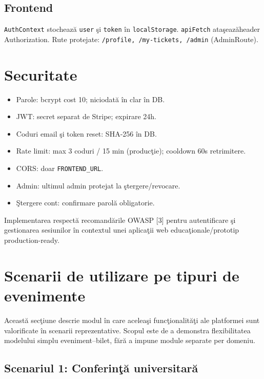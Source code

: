 \subsection{Frontend}

\texttt{AuthContext} stocheaz\u a \texttt{user} \c si \texttt{token} \^in \texttt{localStorage}. \texttt{apiFetch} \linebreak ata\c seaz\u aheader Authorization. Rute protejate: \texttt{/profile, /my-tickets, /admin} (AdminRoute).



\section{Securitate}

\begin{itemize}
	\item Parole: bcrypt cost 10; niciodat\u a \^in clar \^in DB.
	\item JWT: secret separat de Stripe; expirare 24h.
	\item Coduri email \c si token reset: SHA-256 \^in DB.
	\item Rate limit: max 3 coduri / 15 min (produc\c tie); cooldown 60s retrimitere.
	\item CORS: doar \texttt{FRONTEND\_URL}.
	\item Admin: ultimul admin protejat la \c stergere/revocare.
	\item \c Stergere cont: confirmare parol\u a obligatorie.
\end{itemize}

Implementarea respect\u a recomand\u arile OWASP [3] pentru autentificare \c si gestionarea sesiunilor \^in contextul unei aplica\c tii web educa\c tionale/prototip production-ready.

\section{Scenarii de utilizare pe tipuri de evenimente}

Aceast\u a sec\c tiune descrie modul \^in care acelea\c si func\c tionalit\u a\c ti ale platformei sunt valorificate \^in scenarii reprezentative. Scopul este de a demonstra flexibilitatea modelului simplu eveniment--bilet, f\u ar\u a a impune module separate per domeniu.

\subsection{Scenariul 1: Conferin\c t\u a universitar\u a}

